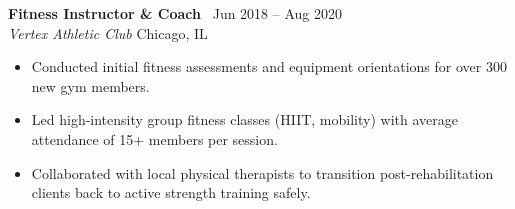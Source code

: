 \documentclass[10pt]{article}
\newcommand{\job}[4]{
  \vspace{6pt}
  {\bfseries\color{primary}#1} \hfill {\color{bodytext}\small\faCalendar\ #2} \\
  {\itshape\color{accent}#3} \hfill {\color{bodytext}\small #4}
  \vspace{2pt}
}
\begin{document}
\begin{minipage}[t]{0.68\textwidth}
  \job{Fitness Instructor \& Coach}{Jun 2018 -- Aug 2020}{Vertex Athletic Club}{Chicago, IL}
  \begin{itemize}
    \item Conducted initial fitness assessments and equipment orientations for over 300 new gym members.
    \item Led high-intensity group fitness classes (HIIT, mobility) with average attendance of 15+ members per session.
    \item Collaborated with local physical therapists to transition post-rehabilitation clients back to active strength training safely.
  \end{itemize}
  
\end{minipage}
\end{document}
